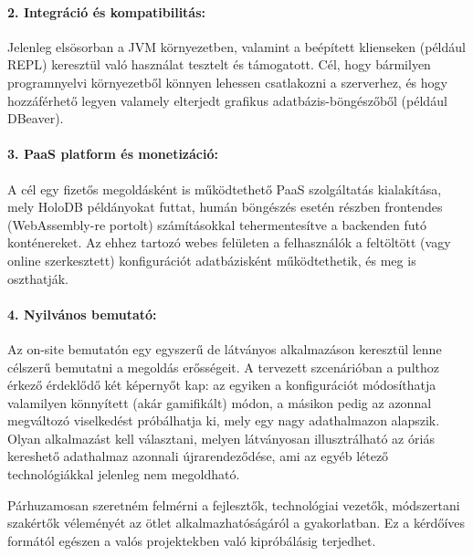\documentclass[12pt]{article}
\begin{document}
\paragraph{2. Integráció és kompatibilitás:}
Jelenleg elsösorban a JVM környezetben, valamint a beépített klienseken (például REPL) keresztül való használat tesztelt és támogatott.
Cél, hogy bármilyen programnyelvi környezetből könnyen lehessen csatlakozni a szerverhez,
és hogy hozzáférhető legyen valamely elterjedt grafikus adatbázis-böngészőből (például DBeaver).

\paragraph{3. PaaS platform és monetizáció:}
A cél egy fizetős megoldásként is működtethető \mbox{PaaS} szolgáltatás kialakítása,
mely HoloDB példányokat futtat,
humán böngészés esetén részben frontendes (WebAssembly-re portolt) számításokkal tehermentesítve a backenden futó konténereket.
Az ehhez tartozó webes felületen a felhasználók a feltöltött (vagy online szerkesztett)
konfigurációt adatbázisként működtethetik, és meg is oszthatják.

\paragraph{4. Nyilvános bemutató:}
Az on-site bemutatón egy egyszerű de látványos alkalmazáson keresztül lenne célszerű bemutatni a megoldás erősségeit.
A tervezett szcenárióban a pulthoz érkező érdeklődő két képernyőt kap:
az egyiken a konfigurációt módosíthatja valamilyen könnyített (akár gamifikált) módon,
a másikon pedig az azonnal megváltozó viselkedést próbálhatja ki, mely egy nagy adathalmazon alapszik.
Olyan alkalmazást kell választani, melyen látványosan illusztrálható az óriás kereshető adathalmaz azonnali újrarendeződése,
ami az egyéb létező technológiákkal jelenleg nem megoldható.

Párhuzamosan szeretném felmérni a fejlesztők, technológiai vezetők, módszertani szakértők véleményét az ötlet alkalmazhatóságáról a gyakorlatban.
Ez a kérdőíves formától egészen a valós projektekben való kipróbálásig terjedhet.
\end{document}
